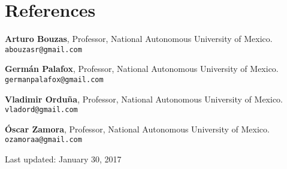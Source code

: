\documentclass[letterpaper]{article}
\renewenvironment{itemize}{
  \begin{list}{}{
    \setlength{\leftmargin}{1.5em}
  }
}{
  \end{list}
}
\begin{document}
\section*{References}
\begin{itemize}
\setlength\itemsep{-.25em}
\setlength{\itemindent}{-.125in}
	\item{\bf Arturo Bouzas}, Professor, National Autonomous University of Mexico. {\tt abouzasr@gmail.com}
	\item{\bf Germán Palafox}, Professor, National Autonomous University of Mexico. {\tt germanpalafox@gmail.com}
	\item{\bf Vladimir Orduña}, Professor, National Autonomous University of Mexico. {\tt vladord@gmail.com}
	\item{\bf Óscar Zamora}, Professor, National Autonomous University of Mexico. {\tt ozamoraa@gmail.com}
\end{itemize}

\bigskip
\begin{center}
  \begin{footnotesize}
    Last updated: January 30, 2017 \\
  \end{footnotesize}
\end{center}
\end{document}
